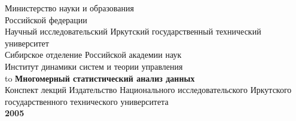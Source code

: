 \documentclass[12pt, openany, twoside]{book} %
\begin{document}
\def\chaptername{Тема}
\def\thechapter{\Roman{chapter}}
\def\thefigure{\arabic{section}.\arabic{figure}}
\def\thetable{\arabic{section}.\arabic{table}}
\fancyhf{} %
\fancyhead[RE]{\slshape \leftmark}
\fancyhead[LO]{\slshape \rightmark}
\fancyhead[RO,LE]{\slshape \thepage}
\renewcommand{\headrulewidth}{1pt}
\renewcommand{\footrulewidth}{0pt}%
\pagestyle{fancy}
\begin{titlepage}
\thispagestyle{empty}
\begin{center}
Министерство науки и образования\\
Российской федерации\\
{\sc Научный исследовательский Иркутский государственный технический университет}\\[0.5em]

{Сибирское отделение Российской академии наук}\\
{\sc Институт динамики систем и теории управления}\\
\vfill
 \hbox to \linewidth{\hfill Е.А.~Черкашин}
 \vfill
{\large\bf Многомерный статистический анализ данных}\\
{Конспект лекций}
\vfill
\vfill
\vfill
Издательство Национального исследовательского Иркутского государственного технического университета\\
 {\bf 2005}
\end{center}
\end{titlepage}
\end{document}
